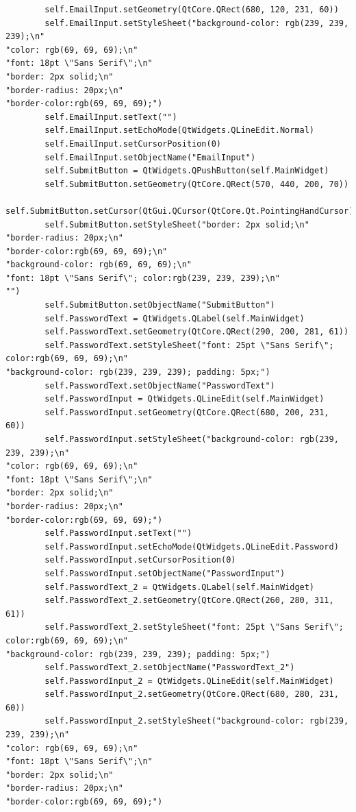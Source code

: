 \documentclass{article}
\begin{document}
\begin{lstlisting}
        self.EmailInput.setGeometry(QtCore.QRect(680, 120, 231, 60))
        self.EmailInput.setStyleSheet("background-color: rgb(239, 239, 239);\n"
"color: rgb(69, 69, 69);\n"
"font: 18pt \"Sans Serif\";\n"
"border: 2px solid;\n"
"border-radius: 20px;\n"
"border-color:rgb(69, 69, 69);")
        self.EmailInput.setText("")
        self.EmailInput.setEchoMode(QtWidgets.QLineEdit.Normal)
        self.EmailInput.setCursorPosition(0)
        self.EmailInput.setObjectName("EmailInput")
        self.SubmitButton = QtWidgets.QPushButton(self.MainWidget)
        self.SubmitButton.setGeometry(QtCore.QRect(570, 440, 200, 70))
        self.SubmitButton.setCursor(QtGui.QCursor(QtCore.Qt.PointingHandCursor))
        self.SubmitButton.setStyleSheet("border: 2px solid;\n"
"border-radius: 20px;\n"
"border-color:rgb(69, 69, 69);\n"
"background-color: rgb(69, 69, 69);\n"
"font: 18pt \"Sans Serif\"; color:rgb(239, 239, 239);\n"
"")
        self.SubmitButton.setObjectName("SubmitButton")
        self.PasswordText = QtWidgets.QLabel(self.MainWidget)
        self.PasswordText.setGeometry(QtCore.QRect(290, 200, 281, 61))
        self.PasswordText.setStyleSheet("font: 25pt \"Sans Serif\"; color:rgb(69, 69, 69);\n"
"background-color: rgb(239, 239, 239); padding: 5px;")
        self.PasswordText.setObjectName("PasswordText")
        self.PasswordInput = QtWidgets.QLineEdit(self.MainWidget)
        self.PasswordInput.setGeometry(QtCore.QRect(680, 200, 231, 60))
        self.PasswordInput.setStyleSheet("background-color: rgb(239, 239, 239);\n"
"color: rgb(69, 69, 69);\n"
"font: 18pt \"Sans Serif\";\n"
"border: 2px solid;\n"
"border-radius: 20px;\n"
"border-color:rgb(69, 69, 69);")
        self.PasswordInput.setText("")
        self.PasswordInput.setEchoMode(QtWidgets.QLineEdit.Password)
        self.PasswordInput.setCursorPosition(0)
        self.PasswordInput.setObjectName("PasswordInput")
        self.PasswordText_2 = QtWidgets.QLabel(self.MainWidget)
        self.PasswordText_2.setGeometry(QtCore.QRect(260, 280, 311, 61))
        self.PasswordText_2.setStyleSheet("font: 25pt \"Sans Serif\"; color:rgb(69, 69, 69);\n"
"background-color: rgb(239, 239, 239); padding: 5px;")
        self.PasswordText_2.setObjectName("PasswordText_2")
        self.PasswordInput_2 = QtWidgets.QLineEdit(self.MainWidget)
        self.PasswordInput_2.setGeometry(QtCore.QRect(680, 280, 231, 60))
        self.PasswordInput_2.setStyleSheet("background-color: rgb(239, 239, 239);\n"
"color: rgb(69, 69, 69);\n"
"font: 18pt \"Sans Serif\";\n"
"border: 2px solid;\n"
"border-radius: 20px;\n"
"border-color:rgb(69, 69, 69);")

\end{lstlisting}
\end{document}
